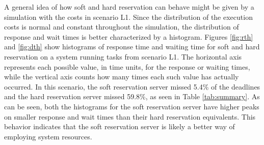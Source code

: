 \documentclass[times, 10pt,twocolumn]{article}
\begin{document}
A general idea of how soft and hard reservation can behave might be
given by a simulation with the costs in scenario L1. Since the
distribution of the execution costs is normal and constant throughout
the simulation, the distribution of response and wait times is better
characterized by a histogram. Figures \ref{fig:rth} and \ref{fig:dth}
show histograms of response time and waiting time for soft and hard
reservation on a system running tasks from scenario L1. The horizontal
axis represents each possible value, in time units, for the response
or waiting times, while the vertical axis counts how many times each
such value has actually occurred. In this scenario, the soft
reservation server missed 5.4\% of the deadlines and the hard
reservation server missed 59.8\%, as seen in Table
\ref{tab:summary}. As can be seen, both the histograms for the soft
reservation server have higher peaks on smaller response and wait
times than their hard reservation equivalents. This behavior indicates
that the soft reservation server is likely a better way of employing
system resources.
\end{document}
